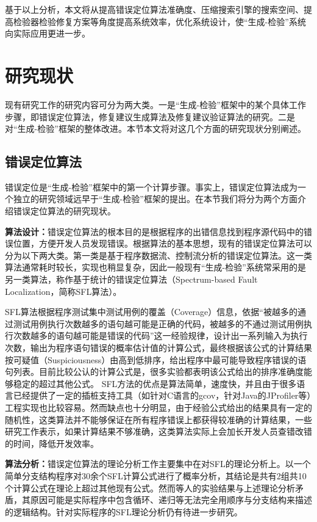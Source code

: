 基于以上分析，本文将从提高错误定位算法准确度、压缩搜索引擎的搜索空间、提高检验器检验修复方案等角度提高系统效率，优化系统设计，使“生成-检验”系统向实际应用更进一步。

\section{研究现状}%

现有研究工作的研究内容可分为两大类。一是“生成-检验”框架中的某个具体工作步骤，即错误定位算法，修复建议生成算法及修复建议验证算法的研究。二是对“生成-检验”框架的整体改进。本节本文将对这几个方面的研究现状分别阐述。
\subsection{错误定位算法}
错误定位是“生成-检验”框架中的第一个计算步骤。事实上，错误定位算法成为一个独立的研究领域远早于“生成-检验”框架的提出。在本节我们将分为两个方面介绍错误定位算法的研究现状。

\textbf{算法设计：}错误定位算法的根本目的是根据程序的出错信息找到程序源代码中的错误位置，方便开发人员发现错误。根据算法的基本思想，现有的错误定位算法可以分为以下两大类。第一类是基于程序数据流、控制流分析的错误定位算法。这一类算法通常耗时较长，实现也稍显复杂，因此一般现有“生成-检验”系统常采用的是另一类算法，称作基于统计的错误定位算法（Spectrum-based Fault Localization，简称SFL算法）。

SFL算法根据程序测试集中测试用例的覆盖（Coverage）信息，依据“被越多的通过测试用例执行次数越多的语句越可能是正确的代码，被越多的不通过测试用例执行次数越多的语句越可能是错误的代码”这一经验规律，设计出一系列输入为执行次数，输出为程序语句错误的概率估计值的计算公式，最终根据该公式的计算结果按可疑值（Suspiciousness）由高到低排序，给出程序中最可能导致程序错误的语句列表。目前比较公认的计算公式是\cite{Abreu:2006:ESC:1193217.1194368}，很多实验\cite{Yu:2008:ESE:1368088.1368116}\cite{Abreu20091780}都表明该公式给出的排序准确度能够稳定的超过其他公式。
SFL方法的优点是算法简单，速度快，并且由于很多语言已经提供了一定的插桩支持工具（如针对C语言的gcov，针对Java的JProfiler等）工程实现也比较容易。然而缺点也十分明显，由于经验公式给出的结果具有一定的随机性，这类算法并不能够保证在所有程序错误上都获得较准确的计算结果，一些研究工作表示，如果计算结果不够准确，这类算法实际上会加长开发人员查错改错的时间，降低开发效率。

\textbf{算法分析：}错误定位算法的理论分析工作主要集中在对SFL的理论分析上。\cite{xie2013theoretical}以一个简单分支结构程序对30余个SFL计算公式进行了概率分析，其结论是共有2组共10个计算公式在理论上超过其他现有公式。然而\cite{6676912}等人的实验结果与上述理论分析矛盾，其原因可能是实际程序中包含循环、递归等无法完全用顺序与分支结构来描述的逻辑结构。针对实际程序的SFL理论分析仍有待进一步研究。

